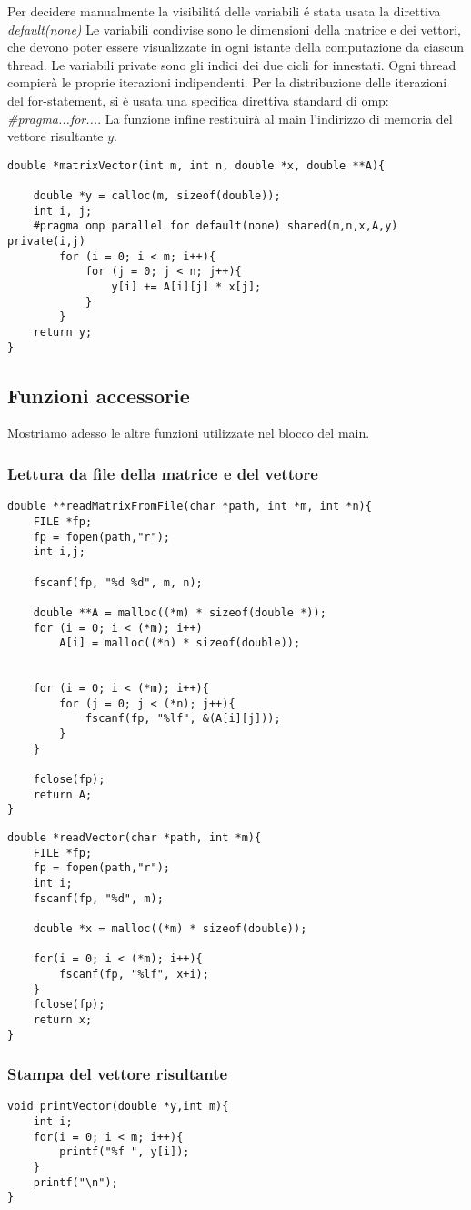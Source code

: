 Per decidere manualmente la visibilitá delle variabili é stata usata la direttiva \textit{default(none)}
Le variabili condivise sono le dimensioni della matrice e dei vettori, che devono poter essere visualizzate in ogni istante della computazione da ciascun thread.
Le variabili private sono gli indici dei due cicli for innestati. Ogni thread compierà le proprie iterazioni indipendenti.
Per la distribuzione delle iterazioni del for-statement, si è usata una specifica direttiva  standard di omp: \textit{\#pragma...for...}. 
La funzione infine restituirà al main l'indirizzo di memoria del vettore risultante $y$.
\begin{lstlisting}
double *matrixVector(int m, int n, double *x, double **A){
    
    double *y = calloc(m, sizeof(double));
    int i, j;
    #pragma omp parallel for default(none) shared(m,n,x,A,y) private(i,j)
        for (i = 0; i < m; i++){
            for (j = 0; j < n; j++){
                y[i] += A[i][j] * x[j];
            }
        }
    return y;
}
\end{lstlisting}

\subsection{Funzioni accessorie}
Mostriamo adesso le altre funzioni utilizzate nel blocco del main.
\subsubsection{Lettura da file della matrice e del vettore}
\begin{lstlisting}
double **readMatrixFromFile(char *path, int *m, int *n){
    FILE *fp;
    fp = fopen(path,"r");
    int i,j;

    fscanf(fp, "%d %d", m, n);

    double **A = malloc((*m) * sizeof(double *));
    for (i = 0; i < (*m); i++)
        A[i] = malloc((*n) * sizeof(double));

    
    for (i = 0; i < (*m); i++){
        for (j = 0; j < (*n); j++){
            fscanf(fp, "%lf", &(A[i][j]));
        }
    }

    fclose(fp);
    return A;
}
\end{lstlisting}

\begin{lstlisting}
double *readVector(char *path, int *m){
    FILE *fp;
    fp = fopen(path,"r");
    int i;
    fscanf(fp, "%d", m);

    double *x = malloc((*m) * sizeof(double));

    for(i = 0; i < (*m); i++){
        fscanf(fp, "%lf", x+i);
    }
    fclose(fp);
    return x;
}
\end{lstlisting}

\subsubsection{Stampa del vettore risultante}
\begin{lstlisting}
void printVector(double *y,int m){
    int i;
    for(i = 0; i < m; i++){
        printf("%f ", y[i]);
    }
    printf("\n");
}
\end{lstlisting}